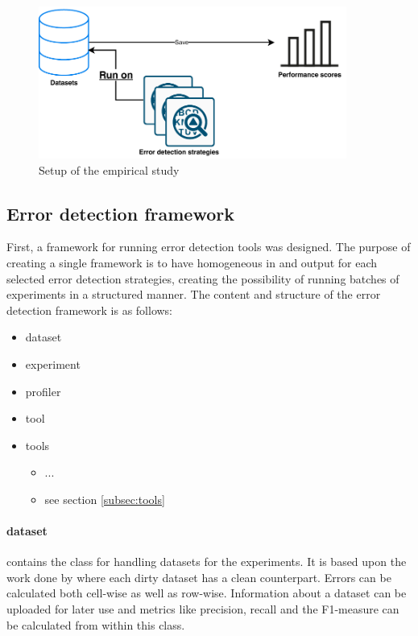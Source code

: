 \begin{figure}[h]
    \centering
    \includegraphics[width=0.9\textwidth]{thesis/Figures/Method/PerformanceEstimation-Experiment.pdf}
    \caption{Setup of the empirical study}
    \label{fig:empiricalsetup}
\end{figure}

\subsection{Error detection framework}
First, a framework for running error detection tools was designed. The purpose of creating a single framework is to have homogeneous in and output for each selected error detection strategies, creating the possibility of running batches of experiments in a structured manner. 
The content and structure of the error detection framework is as follows:
\begin{itemize}[label=]
\item dataset
\item experiment
\item profiler
\item tool
\item tools
    \begin{itemize}[label=]
        \item ...
        \item see section \ref{subsec:tools}
    \end{itemize}
\end{itemize}

\paragraph{dataset} contains the class for handling datasets for the experiments. It is based upon the work done by \cite{Mahdavi2019-zf} where each dirty dataset has a clean counterpart. Errors can be calculated both cell-wise as well as row-wise. Information about a dataset can be uploaded for later use and metrics like precision, recall and the F1-measure can be calculated from within this class.

